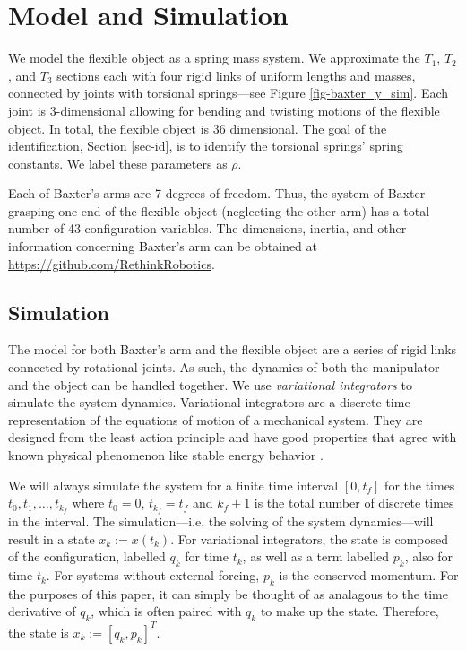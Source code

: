 \documentclass[runningheads,a4paper]{llncs}
\begin{document}
\section{Model and Simulation \label{sec-sim}}
\label{sec-sim}
We model the flexible object as a spring mass system. We approximate the $T_1$, $T_2$, and $T_3$ sections each with four rigid links of uniform lengths and masses, connected by joints with torsional springs---see Figure \ref{fig-baxter_y_sim}. Each joint is 3-dimensional allowing for bending and twisting motions of the flexible object. In total, the flexible object is 36 dimensional. The goal of the identification, Section \ref{sec-id}, is to identify the torsional springs' spring constants. We label these parameters as $\rho$.

Each of Baxter's arms are 7 degrees of freedom. Thus, the system of Baxter grasping one end of the flexible object (neglecting the other arm) has a total number of 43 configuration variables. The dimensions,  inertia, and other information concerning Baxter's arm can be obtained at \url{https://github.com/RethinkRobotics}.  

\subsection{Simulation}
The model for both Baxter's arm and the flexible object are a series of rigid links connected by rotational joints. As such, the dynamics of both the manipulator and the object can be handled together. We use \emph{variational integrators} to simulate the system dynamics.   Variational integrators are a discrete-time representation of the equations of motion of a mechanical system.  They are designed from the least action principle and have good properties that agree with known physical phenomenon like stable energy behavior \cite{pekarek_murphey}.  

We will always simulate the system for a finite time interval $[0,t_f]$ for the times $t_0,t_1,\ldots,t_{k_f}$ where $t_0 = 0$, $t_{k_f} = t_f$ and $k_f+1$ is the total number of discrete times in the interval. The simulation---i.e. the solving of the system dynamics---will result in a state $x_k:=x(t_k)$.  For variational integrators, the state is composed of the configuration, labelled $q_k$ for time $t_k$, as well as a term labelled $p_k$, also for time $t_k$. For systems without external forcing, $p_k$ is the conserved momentum.  For the purposes of this paper, it can simply be thought of as analagous to the time derivative of $q_k$, which is often paired with $q_k$ to make up the state.  Therefore, the state is $x_k:=[q_k,p_k]^T$. 
\end{document}
